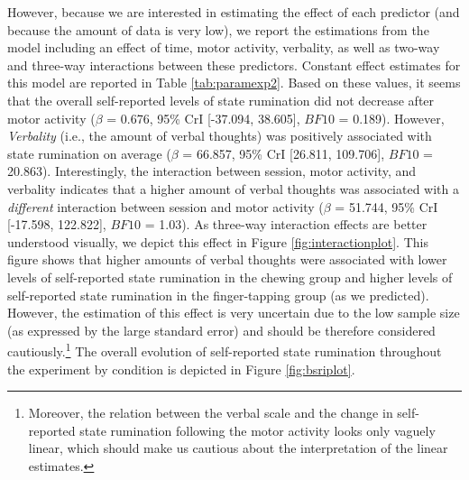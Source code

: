\documentclass[a4paper,12pt,twoside,openright,oldfontcommands,final]{memoir}
\let\rmarkdownfootnote\footnote%
\def\footnote{\protect\rmarkdownfootnote}
\begin{document}
However, because we are interested in estimating the effect of each predictor (and because the amount of data is very low), we report the estimations from the model including an effect of time, motor activity, verbality, as well as two-way and three-way interactions between these predictors. Constant effect estimates for this model are reported in Table \ref{tab:paramexp2}. Based on these values, it seems that the overall self-reported levels of state rumination did not decrease after motor activity (\(\beta\) = 0.676, 95\% CrI {[}-37.094, 38.605{]}, \(BF10\) = 0.189). However, \emph{Verbality} (i.e., the amount of verbal thoughts) was positively associated with state rumination on average (\(\beta\) = 66.857, 95\% CrI {[}26.811, 109.706{]}, \(BF10\) = 20.863). Interestingly, the interaction between session, motor activity, and verbality indicates that a higher amount of verbal thoughts was associated with a \emph{different} interaction between session and motor activity (\(\beta\) = 51.744, 95\% CrI {[}-17.598, 122.822{]}, \(BF10\) = 1.03). As three-way interaction effects are better understood visually, we depict this effect in Figure \ref{fig:interactionplot}. This figure shows that higher amounts of verbal thoughts were associated with lower levels of self-reported state rumination in the chewing group and higher levels of self-reported state rumination in the finger-tapping group (as we predicted). However, the estimation of this effect is very uncertain due to the low sample size (as expressed by the large standard error) and should be therefore considered cautiously.\footnote{Moreover, the relation between the verbal scale and the change in self-reported state rumination following the motor activity looks only vaguely linear, which should make us cautious about the interpretation of the linear estimates.} The overall evolution of self-reported state rumination throughout the experiment by condition is depicted in Figure \ref{fig:bsriplot}.
\end{document}
